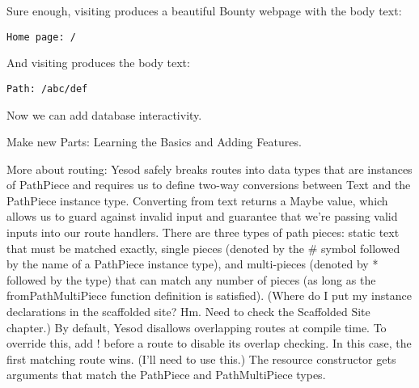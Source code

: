 Sure enough, visiting  produces a beautiful Bounty webpage with the body text:

\begin{Verbatim}
Home page: /
\end{Verbatim}

And visiting  produces the body text:

\begin{Verbatim}
Path: /abc/def
\end{Verbatim}

Now we can add database interactivity.

Make new Parts: Learning the Basics and Adding Features.

More about routing:
  Yesod safely breaks routes into data types that are instances of PathPiece and requires us to define two-way conversions between Text and the PathPiece instance type. Converting from text returns a Maybe value, which allows us to guard against invalid input and guarantee that we're passing valid inputs into our route handlers.
  There are three types of path pieces: static text that must be matched exactly, single pieces (denoted by the \# symbol followed by the name of a PathPiece instance type), and multi-pieces (denoted by * followed by the type) that can match any number of pieces (as long as the fromPathMultiPiece function definition is satisfied). (Where do I put my instance declarations in the scaffolded site? Hm. Need to check the Scaffolded Site chapter.)
  By default, Yesod disallows overlapping routes at compile time. To override this, add ! before a route to disable its overlap checking. In this case, the first matching route wins. (I'll need to use this.)
  The resource constructor gets arguments that match the PathPiece and PathMultiPiece types.

